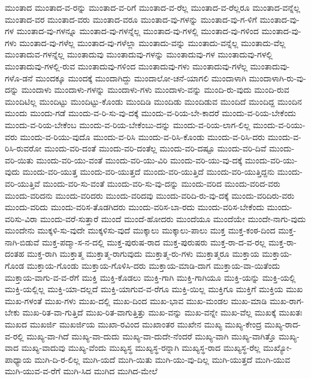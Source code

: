 {ಮುಂತಾದ
ಮುಂತಾದ-ವ-ರನ್ನು
ಮುಂತಾದ-ವ-ರಿಗೆ
ಮುಂತಾದ-ವ-ರೆಲ್ಲ
ಮುಂತಾದ-ವ-ರೆಲ್ಲರೂ
ಮುಂತಾದ-ವನ್ನೆಲ್ಲ
ಮುಂತಾದ-ವರ
ಮುಂತಾದ-ವರು
ಮುಂತಾದ-ವರೂ
ಮುಂತಾದ-ವು-ಗಳನ್ನು
ಮುಂತಾದ-ವು-ಗ-ಳಿಗೆ
ಮುಂತಾದ-ವು-ಗಳ
ಮುಂತಾದ-ವು-ಗಳನ್ನೂ
ಮುಂತಾದ-ವು-ಗಳನ್ನೆಲ್ಲ
ಮುಂತಾದ-ವು-ಗಳಲ್ಲಿ
ಮುಂತಾದ-ವು-ಗಳಿಂದ
ಮುಂತಾದ-ವು-ಗಳು
ಮುಂತಾದ-ವು-ಗಳೆಲ್ಲ
ಮುಂತಾದ-ವು-ಗಳೆಲ್ಲಾ
ಮುಂತಾದು-ವನ್ನು
ಮುಂತಾದು-ವನ್ನೆಲ್ಲ
ಮುಂತಾದು-ವೆಲ್ಲ
ಮುಂತಾದುವ-ಗಳನ್ನೆಲ್ಲ
ಮುಂತಾದುವು
ಮುಂತಾದುವು-ಗಳನ್ನು
ಮುಂತಾದುವು-ಗಳ
ಮುಂತಾದುವು-ಗಳಲ್ಲಿ
ಮುಂತಾದುವು-ಗಳಲ್ಲಿ-ರುವ
ಮುಂತಾದುವು-ಗಳಿಂದ
ಮುಂತಾದುವು-ಗಳು
ಮುಂತಾದುವು-ಗಳೆಲ್ಲ
ಮುಂತಾದುವು-ಗಳೊ-ಡನೆ
ಮುಂದಕ್ಕೂ
ಮುಂದಕ್ಕೆ
ಮುಂದಾಗಿದ್ದು
ಮುಂದಾಲೋ-ಚನೆ-ಯಾಗಲಿ
ಮುಂದಾಳಾಗಿ
ಮುಂದಾಳಾಗಿ-ರು-ವು-ದನ್ನು
ಮುಂದಾಳು
ಮುಂದಾಳು-ಗಳನ್ನು
ಮುಂದಾಳು-ಗಳು
ಮುಂದಾಳು-ವನ್ನು
ಮುಂದಿ-ರು-ವುದು
ಮುಂದಿ-ರುವ
ಮುಂದಿಟಿಲ್ಲ
ಮುಂದಿಟ್ಟು
ಮುಂದಿಟ್ಟು-ಕೊಂಡು
ಮುಂದಿಡಿ
ಮುಂದಿಡು
ಮುಂದಿಡುವ
ಮುಂದಿದೆ
ಮುಂದಿದ್ದ
ಮುಂದಿನ
ಮುಂದು
ಮುಂದು-ಗಡೆ
ಮುಂದು-ವ-ರಿ-ಸು-ವು-ದಕ್ಕೆ
ಮುಂದು-ವ-ರಿಯ-ಬೇ-ಕಾದರೆ
ಮುಂದು-ವ-ರಿಯ-ಬೇಕೆಂದು
ಮುಂದು-ವ-ರಿಯ-ಬೇಕೆಂಬ
ಮುಂದು-ವ-ರಿಯ-ಬೇಕೆಂಬು-ದನ್ನು
ಮುಂದು-ವ-ರಿಯ-ಲಾಗ-ಲಿಲ್ಲ
ಮುಂದು-ವ-ರಿಯು-ವರು
ಮುಂದು-ವ-ರಿಯು-ವುದೊ
ಮುಂದು-ವ-ರಿಸಿ
ಮುಂದು-ವ-ರಿಸಿ-ಕೊಂಡು
ಮುಂದು-ವ-ರಿಸಿ-ದರು
ಮುಂದು-ವ-ರಿಸಿ-ರುವರೋ
ಮುಂದು-ವರಿ-ದಂತೆ
ಮುಂದು-ವರಿ-ದಂತೆಲ್ಲ
ಮುಂದು-ವರಿ-ದಷ್ಟೂ
ಮುಂದು-ವರಿ-ದಿವೆ
ಮುಂದು-ವರಿ-ಯಿತು
ಮುಂದು-ವರಿ-ಯು-ವಂತೆ
ಮುಂದು-ವರಿ-ಯು-ವಿರಿ
ಮುಂದು-ವರಿ-ಯು-ವು-ದಕ್ಕೆ
ಮುಂದು-ವರಿ-ಯು-ವುದು
ಮುಂದು-ವರಿ-ಯುತ್ತ
ಮುಂದು-ವರಿ-ಯುತ್ತದೆ
ಮುಂದು-ವರಿ-ಯುತ್ತಿದೆ
ಮುಂದು-ವರಿ-ಯುತ್ತಿದ್ದನು
ಮುಂದು-ವರಿ-ಯುತ್ತಿವೆ
ಮುಂದು-ವರಿ-ಸು-ವಂತೆ
ಮುಂದು-ವರಿ-ಸು-ವು-ದನ್ನು
ಮುಂದು-ವರಿದ
ಮುಂದು-ವರಿದ-ವರು
ಮುಂದು-ವರಿದನು
ಮುಂದು-ವರಿದರು
ಮುಂದು-ವರಿದವು
ಮುಂದು-ವರಿದಿ-ರು-ವು-ದಕ್ಕೆ
ಮುಂದು-ವರಿದಿರು-ವರು
ಮುಂದು-ವರಿದು
ಮುಂದು-ವರಿಸ-ತೊಡಗಿದರು
ಮುಂದು-ವರಿಸ-ಬಾ-ರದು
ಮುಂದು-ವರಿಸ-ಬೇಕೆಂದು
ಮುಂದು-ವರಿಸು-ವಿರಾ
ಮುಂದು-ವರೆ-ಸುತ್ತಾರೆ
ಮುಂದೆ
ಮುಂದೆ-ಹೋದರು
ಮುಂದೆಯೂ
ಮುಂದೆಯೇ
ಮುಂದೇ-ನಾಗು-ವುದು
ಮುಂದೇನು
ಮುಕ್ಕಳಿ-ಸು-ವುದೇ
ಮುಕ್ಕಳಿಸು-ವುದೆ
ಮುಕ್ಕಾಲು
ಮುಕ್ಕಾಲು-ಪಾಲು
ಮುಕ್ತ
ಮುಕ್ತ-ಕಂಠ-ದಿಂದ
ಮುಕ್ತ-ನಾಗಿ-ಬಿಡುವೆ
ಮುಕ್ತ-ಪದ್ಮಾ-ಸ-ನ-ದಲ್ಲಿ
ಮುಕ್ತ-ಪುರುಷ-ರಾದ
ಮುಕ್ತ-ಪುರುಷರು
ಮುಕ್ತ-ರಾ-ದ-ವ-ರಲ್ಲ
ಮುಕ್ತ-ರಾ-ದಂತಹ
ಮುಕ್ತ-ರಾಗಿ
ಮುಕ್ತಾತ್ಮ
ಮುಕ್ತಾತ್ಮ-ರಾಗುವುದು
ಮುಕ್ತಾತ್ಮ-ರು-ಗಳು
ಮುಕ್ತಾತ್ಮರೂ
ಮುಕ್ತಾಯ
ಮುಕ್ತಾಯ-ಗೊಂಡ
ಮುಕ್ತಾಯ-ಗೊಂಡು
ಮುಕ್ತಾಯ-ಗೊಳಿಸಿ-ದರು
ಮುಕ್ತಾಯ-ಮಾಡಿ-ದಾಗ
ಮುಕ್ತಾಯ-ವಾ-ಯಿತೆಂದು
ಮುಕ್ತಾಯ-ವಾಗು-ವ-ವ-ರೆಗೆ
ಮುಕ್ತಿ
ಮುಕ್ತಿ-ಕೊಡಲು
ಮುಕ್ತಿ-ಗಾಗಿ
ಮುಕ್ತಿ-ಗಾಗಿಯೂ
ಮುಕ್ತಿ-ಯನ್ನು
ಮುಕ್ತಿ-ಯಲ್ಲಿ
ಮುಕ್ತಿ-ಯಲ್ಲಿಲ್ಲ
ಮುಕ್ತಿ-ಯಾ-ದಲ್ಲದೆ
ಮುಕ್ತಿ-ಯಾಗುವ-ವ-ರೆಗೂ
ಮುಕ್ತಿ-ಯಿಲ್ಲ
ಮುಕ್ತಿಗೂ
ಮುಕ್ತಿಗೆ
ಮುಕ್ತಿಯ
ಮುಖ
ಮುಖ-ಗಳಂತೆ
ಮುಖ-ಗಳು
ಮುಖ-ದಲ್ಲಿ
ಮುಖ-ದಿಂದ
ಮುಖ-ಭಾವ
ಮುಖ-ಮಂಡಲ
ಮುಖ-ಮಾಡಿ
ಮುಖ-ರಾಗ-ಬೇಕು
ಮುಖ-ರಿತ-ವಾ-ಗುತ್ತಿದೆ
ಮುಖ-ರಿತ-ವಾಗುತ್ತಿತ್ತು
ಮುಖ-ವನ್ನು
ಮುಖ-ವನ್ನೇ
ಮುಖ-ವೆಲ್ಲ
ಮುಖಕ್ಕೆ
ಮುಖತಃ
ಮುಖದ
ಮುಖರ್ಜಿ
ಮುಖರ್ಜಿಯ
ಮುಖಾ-ರವಿಂದ
ಮುಖಾಂತರ
ಮುಖೇನ
ಮುಖ್ಯ
ಮುಖ್ಯ-ಕೇಂದ್ರ
ಮುಖ್ಯ-ರಾದ-ವ-ರಲ್ಲಿ
ಮುಖ್ಯ-ವಾ-ಗಿದೆ
ಮುಖ್ಯ-ವಾ-ದುದು
ಮುಖ್ಯ-ವಾ-ದುದೇ-ನೆಂದರೆ
ಮುಖ್ಯ-ವಾಗಿ
ಮುಖ್ಯ-ವಾಗಿತ್ತೊ
ಮುಖ್ಯ-ವಾದ
ಮುಖ್ಯ-ವಾದುವು
ಮುಖ್ಯ-ವೆಂದು
ಮುಖ್ಯಸ್ಥ
ಮುಖ್ಯಸ್ಥ-ರನ್ನಾಗಿ
ಮುಖ್ಯಸ್ಥ-ರಾದ
ಮುಖ್ಯಸ್ಥ-ರೆಲ್ಲ
ಮುಖ್ಯೋ-ಪಾಧ್ಯಾಯ
ಮುಗಿ-ದಿ-ರ-ಲಿಲ್ಲ
ಮುಗಿ-ಯದೆ
ಮುಗಿ-ಯಿತು
ಮುಗಿ-ಯು-ವು-ದಿಲ್ಲ
ಮುಗಿ-ಯುತ್ತದೆ
ಮುಗಿ-ಯುವ
ಮುಗಿ-ಯುವ-ವ-ರೆಗೆ
ಮುಗಿ-ಸಿದ
ಮುಗಿದ
ಮುಗಿದ-ಮೇಲೆ
}
